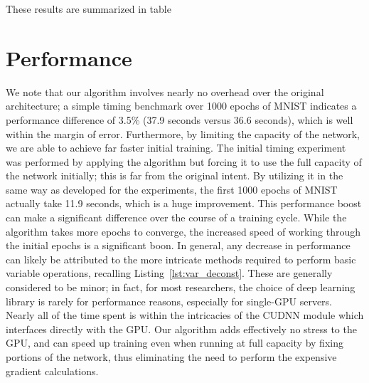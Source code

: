 These results are summarized in table


\section{Performance}
We note that our algorithm involves nearly no overhead over the original architecture; a simple timing benchmark over 1000 epochs of MNIST indicates a performance difference of 3.5\% (37.9 seconds versus 36.6 seconds), which is well within the margin of error.
Furthermore, by limiting the capacity of the network, we are able to achieve far faster initial training.
The initial timing experiment was performed by applying the algorithm but forcing it to use the full capacity of the network initially; this is far from the original intent.
By utilizing it in the same way as developed for the experiments, the first 1000 epochs of MNIST actually take 11.9 seconds, which is a huge improvement.
This performance boost can make a significant difference over the course of a training cycle.
While the algorithm takes more epochs to converge, the increased speed of working through the initial epochs is a significant boon.
In general, any decrease in performance can likely be attributed to the more intricate methods required to perform basic variable operations, recalling Listing~\ref{lst:var_deconst}.
These are generally considered to be minor; in fact, for most researchers, the choice of deep learning library is rarely for performance reasons, especially for single-GPU servers.
Nearly all of the time spent is within the intricacies of the CUDNN module which interfaces directly with the GPU.
Our algorithm adds effectively no stress to the GPU, and can speed up training even when running at full capacity by fixing portions of the network, thus eliminating the need to perform the expensive gradient calculations.